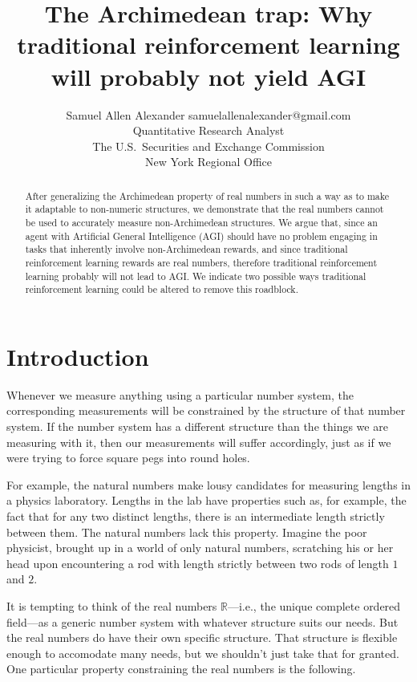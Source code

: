 \documentclass[twoside,11pt]{article}
\author{\name Samuel Allen Alexander
\email samuelallenalexander@gmail.com \\
\addr Quantitative Research Analyst\\
The U.S.\ Securities and Exchange Commission\\
New York Regional Office
}
\title{The Archimedean trap: Why
traditional reinforcement learning will probably not yield AGI}
\begin{document}
\maketitle

\begin{abstract}
After generalizing the Archimedean property of real numbers in such a
way as to make it adaptable to non-numeric structures, we demonstrate
that the real numbers cannot be used to accurately measure non-Archimedean
structures. We argue that, since an agent with Artificial General
Intelligence (AGI) should have no problem engaging in tasks that inherently
involve non-Archimedean rewards, and since traditional reinforcement
learning rewards are real numbers, therefore traditional reinforcement
learning probably will not lead to AGI. We indicate two possible ways traditional
reinforcement learning could be altered to remove this roadblock.
\end{abstract}

\section{Introduction}

Whenever we measure anything using a particular number system, the
corresponding measurements will be constrained by the structure of that
number system. If the number system has a different structure than
the things we are measuring with it, then our
measurements will suffer accordingly, just as if we were trying to
force square pegs into round holes.

For example, the natural numbers make lousy candidates for measuring
lengths in a physics laboratory. Lengths in the lab have
properties such as, for example, the fact that for any two distinct
lengths, there is an intermediate length strictly between them.
The natural numbers lack this property. Imagine the poor physicist,
brought up in a world of only natural numbers, scratching his or her
head upon encountering a rod with length strictly between two rods
of length $1$ and $2$.

It is tempting to think of the real numbers $\mathbb R$---i.e., the unique
complete ordered field---as a generic number system with whatever
structure suits our needs. But the
real numbers do have their own specific structure. That structure is
flexible enough to accomodate many needs, but we shouldn't just
take that for granted. One particular property constraining the real numbers
is the following.
\end{document}

